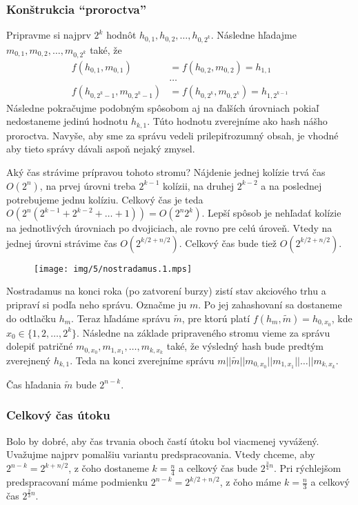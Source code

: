 \subsubsection{Konštrukcia ``proroctva''}

Pripravme si najprv $2^k$ hodnôt $h_{0,1}, h_{0,2}, \dots, h_{0,2^k}$.
Následne hľadajme $m_{0,1}, m_{0,2}, \dots, m_{0,2^k}$ také, že
\begin{align*}
    f(h_{0,1}, m_{0,1}) &= f(h_{0,2}, m_{0,2}) = h_{1,1} \\
  &  \dots \\
    f(h_{0,2^k-1}, m_{0,2^k-1}) &= f(h_{0,2^k}, m_{0,2^k}) = h_{1,
        2^{k-1}} 
\end{align*}
Následne pokračujme podobným spôsobom aj na ďalších úrovniach
pokiaľ nedostaneme jedinú hodnotu $h_{k,1}$.
Túto hodnotu zverejníme ako hash nášho proroctva.
Navyše, aby sme za správu vedeli \clqq prilepiť\crqq rozumný obsah,
je vhodné aby tieto správy dávali aspoň nejaký zmysel.

Aký čas strávime prípravou tohoto stromu?
Nájdenie jednej kolízie trvá čas $O(2^n)$, na prvej úrovni treba 
$2^{k-1}$ kolízii, na druhej $2^{k-2}$ a na poslednej
potrebujeme jednu kolíziu. Celkový čas je teda
$O(2^n (2^{k-1} + 2^{k-2} + \dots + 1)) = O(2^n 2^k)$.
Lepší spôsob je nehľadať kolízie na jednotlivých úrovniach po dvojiciach,
ale rovno pre celú úroveň.
Vtedy na jednej úrovni strávime čas $O(2^{k/2 + n/2})$.
Celkový čas bude tiež $O(2^{k/2 + n/2})$.

\begin{figure}[h]
    \centering
    \texttt{[image: img/5/nostradamus.1.mps]}
\end{figure}

Nostradamus na konci roka (po zatvorení burzy) zistí stav akciového
trhu a pripraví si podľa neho správu.
Označme ju $m$. Po jej zahashovaní sa dostaneme do odtlačku
$h_m$. Teraz hľadáme správu $\tilde{m}$, pre ktorú platí
$f(h_m, \tilde{m}) = h_{0,x_0}$, kde $x_0 \in \{1, 2, \dots, 2^k\}$.
Následne na základe pripraveného stromu vieme za správu dolepiť patričné 
$m_{0,x_0}, m_{1,x_1}, \dots, m_{k,x_k}$ také, že
výsledný hash bude predtým zverejnený $h_{k,1}$.
Teda na konci zverejníme správu 
$m || \tilde{m} || m_{0,x_0} || m_{1,x_1} || \dots || m_{k, x_k}$.

Čas hľadania $\tilde{m}$ bude $2^{n-k}$.

\subsubsection{Celkový čas útoku}
Bolo by dobré, aby čas trvania oboch častí útoku bol viacmenej vyvážený. 
Uvažujme najprv pomalšiu variantu predspracovania.
Vtedy chceme, aby $2^{n-k} = 2^{k+n/2}$, z čoho dostaneme
$k=\frac{n}{4}$ a celkový čas bude $2^{\frac{3}{4} n}$.
Pri rýchlejšom predspracovaní máme podmienku $2^{n-k} = 2^{k/2 + n/2}$,
z čoho máme $k = \frac{n}{3}$ a celkový čas $2^{\frac{2}{3}n}$.

